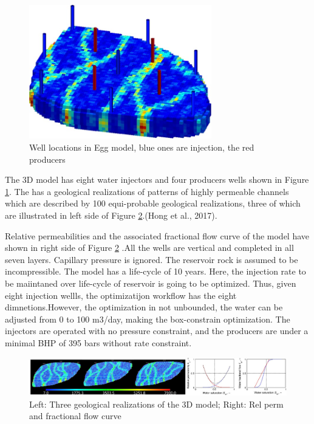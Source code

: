 \documentclass[]{elsarticle} %
\begin{document}
\begin{figure}

{\centering \includegraphics[width=300px]{img/egg_base} 

}

\caption{Well locations in Egg model, blue ones are injection, the red producers}\label{fig:eggbase}
\end{figure}

The 3D model has eight water injectors and four producers wells shown in Figure \ref{fig:eggbase}. The has a geological realizations of patterns of highly permeable channels which are described by 100 equi-probable geological realizations, three of which are illustrated in left side of Figure \ref{fig:combine}.(Hong et al., 2017).

Relative permeabilities and the associated fractional flow curve of the model have shown in right side of Figure \ref{fig:combine} .All the wells are vertical and completed in all seven layers. Capillary pressure is ignored. The reservoir rock is assumed to be incompressible. The model has a life-cycle of 10 years. Here, the injection rate to be maiintaned over life-cycle of reservoir is going to be optimized. Thus, given eight injection wellls, the optimizatijon workflow has the eight dimnetions.However, the optimization in not unbounded, the water can be adjusted from 0 to 100 m3/day, making the box-constrain optimization. The injectors are operated with no pressure constraint, and the producers are under a minimal BHP of 395 bars without rate constraint.

\begin{figure}

{\centering \includegraphics[width=1\linewidth]{img/combine} 

}

\caption{Left: Three geological realizations of the 3D model; Right: Rel perm and fractional flow curve}\label{fig:combine}
\end{figure}
\end{document}
